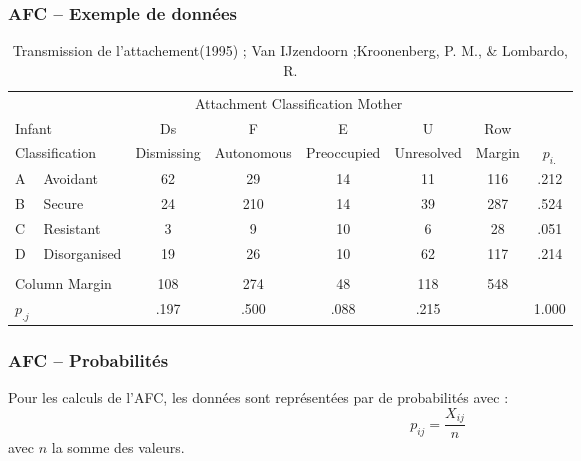 \begin{frame}
  \frametitle{AFC --  Exemple de données}
  \begin{scriptsize}
    \begin{table}
      \begin{tabular}{llcccccc}
        \toprule
        &&\multicolumn{4}{c}{Attachment Classification Mother}\\
        \cline{3-7}
        \multicolumn{2}{l}{Infant} & Ds & F & E & U &Row&\\
        \multicolumn{2}{l}{Classification} & Dismissing & Autonomous & Preoccupied & Unresolved & Margin &$p_{i.}$\\
        \midrule
        A & Avoidant     & 62 &  29 & 14 & 11 & 116& .212\\
        B & Secure       & 24 & 210 & 14 & 39 & 287& .524\\
        C & Resistant    &  3 &   9 & 10 &  6 &  28& .051\\
        D & Disorganised & 19 &  26 & 10 & 62 & 117& .214\\
        &&&&&&&\\
        \multicolumn{2}{l}{Column Margin} & 108 & 274 & 48 & 118 & 548 &\\
        \midrule
        $p_{.j}$& & .197 & .500 & .088 & .215 & & 1.000\\
        \bottomrule
      \end{tabular}
      \caption{Transmission de l'attachement(1995) ; Van  IJzendoorn ;Kroonenberg, P. M., \& Lombardo, R. }
    \end{table}
  \end{scriptsize}
\end{frame}

\begin{frame}
  \frametitle{AFC -- Probabilités}
  \begin{minipage}{0.45\linewidth}
  \end{minipage}
  \hfill
  \begin{minipage}{0.49\linewidth}
    Pour les calculs de l'AFC, les données sont représentées par de probabilités avec :
    \begin{equation*}
      p_{ij}=\frac{X_{ij}}{n} 
    \end{equation*}
    avec $n$ la somme des valeurs.
  \end{minipage}
\end{frame}

